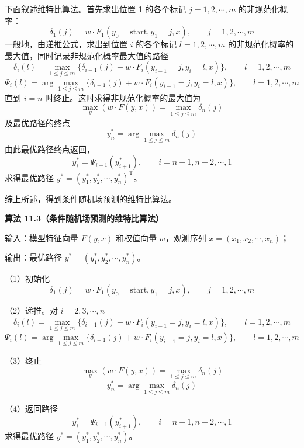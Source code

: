 \documentclass[UTF8, 12pt, fontset=fandol, oneside]{ctexart}
\begin{document}
下面叙述维特比算法。首先求出位置 1 的各个标记 $j=1,2,\cdots,m$ 的非规范化概率：
\begin{equation}
\delta_1(j)=w\cdot F_1(y_0=\mathrm{start},y_1=j,x),\qquad j=1,2,\cdots,m
\tag{11.54}
\end{equation}
一般地，由递推公式，求出到位置 $i$ 的各个标记 $l=1,2,\cdots,m$ 的非规范化概率的最大值，同时记录非规范化概率最大值的路径
\begin{equation}
\delta_i(l)=\max_{1\le j\le m}\{\delta_{i-1}(j)+w\cdot F_i(y_{i-1}=j,y_i=l,x)\},\qquad l=1,2,\cdots,m
\tag{11.55}
\end{equation}
\begin{equation}
\Psi_i(l)=\arg\max_{1\le j\le m}\{\delta_{i-1}(j)+w\cdot F_i(y_{i-1}=j,y_i=l,x)\},\qquad l=1,2,\cdots,m
\tag{11.56}
\end{equation}
直到 $i=n$ 时终止。这时求得非规范化概率的最大值为
\begin{equation}
\max_y(w\cdot F(y,x))=\max_{1\le j\le m}\delta_n(j)
\tag{11.57}
\end{equation}
及最优路径的终点
\begin{equation}
y_n^*=\arg\max_{1\le j\le m}\delta_n(j)
\tag{11.58}
\end{equation}
由此最优路径终点返回，
\begin{equation}
y_i^*=\Psi_{i+1}(y_{i+1}^*),\qquad i=n-1,n-2,\cdots,1
\tag{11.59}
\end{equation}
求得最优路径 $y^*=(y_1^*,y_2^*,\cdots,y_n^*)^{\mathrm T}$。

综上所述，得到条件随机场预测的维特比算法。

\noindent\textbf{算法 11.3（条件随机场预测的维特比算法）}

输入：模型特征向量 $F(y,x)$ 和权值向量 $w$，观测序列 $x=(x_1,x_2,\cdots,x_n)$；

输出：最优路径 $y^*=(y_1^*,y_2^*,\cdots,y_n^*)$。

（1）初始化
\[
\delta_1(j)=w\cdot F_1(y_0=\mathrm{start},y_1=j,x),\qquad j=1,2,\cdots,m
\]

（2）递推。对 $i=2,3,\cdots,n$
\[
\delta_i(l)=\max_{1\le j\le m}\{\delta_{i-1}(j)+w\cdot F_i(y_{i-1}=j,y_i=l,x)\},\qquad l=1,2,\cdots,m
\]
\[
\Psi_i(l)=\arg\max_{1\le j\le m}\{\delta_{i-1}(j)+w\cdot F_i(y_{i-1}=j,y_i=l,x)\},\qquad l=1,2,\cdots,m
\]

（3）终止
\[
\max_y(w\cdot F(y,x))=\max_{1\le j\le m}\delta_n(j)
\]
\[
y_n^*=\arg\max_{1\le j\le m}\delta_n(j)
\]

（4）返回路径
\[
y_i^*=\Psi_{i+1}(y_{i+1}^*),\qquad i=n-1,n-2,\cdots,1
\]
求得最优路径 $y^*=(y_1^*,y_2^*,\cdots,y_n^*)$。
\end{document}
